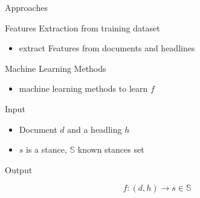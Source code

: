 \documentclass[english,handout]{mlutalk}
\begin{document}
\begin{frame}{Approaches} %
  
  \begin{block}{Features Extraction from training dataset}
    \begin{itemize}
        \item extract Features from documents and headlines  
    \end{itemize}
  \end{block}
  \begin{block}{Machine Learning Methods}
    \begin{itemize}
        \item machine learning methods to learn $f$
    \end{itemize}
  \end{block}
  
  \begin{block}{Input}
  \begin{itemize}
      \item  Document $d$ and a headling $h$
      \item  $s$ is a stance, $\mathbb{S}$ known stances set
  \end{itemize}
  \end{block}
  \begin{block}{Output}
    
    \[f: (d,h) \rightarrow s \in \mathbb{S}\]
   
  \end{block}
\end{frame}
\end{document}

